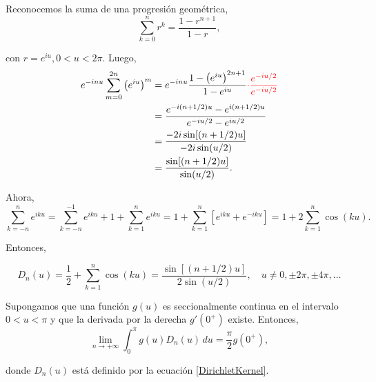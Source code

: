 Reconocemos la suma de una progresión geométrica,
$$\sum_{k=0}^n r^k = \frac{1-r^{n+1}}{1-r},$$

con $r = e^{iu}, 0 < u < 2\pi$. Luego,
\begin{align*}
e^{-inu} \sum_{m=0}^{2n}\left( e^{iu}\right)^m &= e^{-inu} \frac{1-\left( e^{iu}\right)^{2n+1}}{1-e^{iu}} \textcolor{red}{\cdot \frac{e^{-iu/2}}{e^{-iu/2}}} \\
&= \frac{e^{-i(n + 1/2)u} - e^{i(n+1/2)u}}{e^{-iu/2} - e^{i u/2}} \\
&= \frac{-2i \sin[(n+1/2) u]}{-2i \sin(u/2)} \\
&=  \frac{\sin[(n+1/2) u]}{\sin(u/2)}.
\end{align*}

Ahora,
\begin{equation*}
     \sum_{k= -n}^{n} e^{i k u} = \sum_{k=-n}^{-1} e^{iku} + 1 + \sum_{k=1}^n e^{iku} = 1 + \sum_{k=1}^n [e^{iku} + e^{-iku}] = 1 + 2 \sum_{k=1}^n \cos(ku).
\end{equation*}

Entonces, 
\begin{shaded}
 \begin{equation}
 D_n(u) = \frac{1}{2} + \sum_{k=1}^n \cos(ku) = \frac{\sin[(n+1/2)u]}{2 \sin(u/2)}, \quad u \neq 0, \pm 2\pi, \pm 4\pi, \dots    \label{NucleoDirichlet}
\end{equation}   
\end{shaded}

\begin{lema} \label{lema2}
Supongamos que una función $g(u)$ es seccionalmente continua en el intervalo $0 < u < \pi$ y que la derivada por la derecha $g'(0^+)$ existe. Entonces,
\begin{equation}
    \lim_{n \to + \infty} \int_0^{\pi} g(u) D_n(u) \,du = \frac{\pi}{2} g(0^+), \label{LemaFourier2}
\end{equation}

donde $D_n(u)$ está definido por la ecuación \eqref{DirichletKernel}.
\end{lema}

